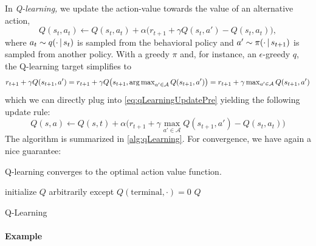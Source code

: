			In \emph{Q-learning,} we update the action-value towards the value of an alternative action,
			\begin{equation}
				Q(s_t, a_t) \gets Q(s_t, a_t) + \alpha \bigl( r_{t + 1} + \gamma Q(s_t, a') - Q(s_t, a_t) \bigr),  \label{eq:qLearningUpdatePre}
			\end{equation}
			where \( a_t \sim q(\cdot \,\vert\, s_t) \) is sampled from the behavioral policy and \( a' \sim \pi(\cdot \,\vert\, s_{t + 1}) \) is sampled from another policy. With a greedy \(\pi\) and, for instance, an \(\epsilon\)-greedy \(q\), the Q-learning target simplifies to
			\begin{equation}
				r_{t + 1} + \gamma Q(s_{t + 1}, a')
					= r_{t + 1} + \gamma Q\bigl( s_{t + 1}, \textstyle\operatorname*{arg\,max}_{a' \in \mathcal{A}}\displaystyle Q(s_{t + 1}, a') \bigr)
					= r_{t + 1} + \gamma \textstyle\max_{a' \in \mathcal{A}}\displaystyle Q(s_{t + 1}, a')
			\end{equation}
			which we can directly plug into \eqref{eq:qLearningUpdatePre} yielding the following update rule:
			\begin{equation}
				Q(s, a) \gets Q(s, t) + \alpha \bigl( r_{t + 1} + \gamma \textstyle\max_{a' \in \mathcal{A}}\displaystyle Q(s_{t + 1}, a') - Q(s_t, a_t) \bigr)
			\end{equation}
			The algorithm is summarized in \autoref{alg:qLearning}. For convergence, we have again a nice guarantee:
			\begin{theorem}
				Q-learning converges to the optimal action value function.
			\end{theorem}

			\begin{algorithm}  \DontPrintSemicolon
				initialize \(Q\) arbitrarily except \(Q(\mathrm{terminal}, \cdot) = 0\) \;
				\Return \(Q\) \;
				\caption{Q-Learning}
				\label{alg:qLearning}
			\end{algorithm}

			\paragraph{Example} %

